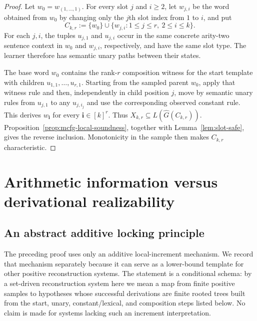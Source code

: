 \documentclass[11pt]{article}
\begin{document}
\begin{proof}
Let $w_0=w_{(1,\ldots,1)}$.  For every slot $j$ and $i\ge2$, let $w_{j,i}$
be the word obtained from $w_0$ by changing only the $j$th slot index from
$1$ to $i$, and put
\[
 C_{k,r}:=\{w_0\}\cup\{w_{j,i}:1\le j\le r,\ 2\le i\le k\}.
\]
For each $j,i$, the tuples $u_{j,1}$ and $u_{j,i}$ occur in the same concrete
arity-two sentence context in $w_0$ and $w_{j,i}$, respectively, and have the
same slot type.  The learner therefore has semantic unary paths between their
states.

The base word $w_0$ contains the rank-$r$ composition witness for the
start template with children $u_{1,1},\ldots,u_{r,1}$.  Starting from the
sampled parent $w_0$, apply that witness rule and then, independently in child
position $j$, move by semantic unary rules from $u_{j,1}$ to any
$u_{j,i_j}$ and use the corresponding observed constant rule.  This derives
$w_{\mathbf i}$ for every $\mathbf i\in[k]^r$.  Thus
$X_{k,r}\subseteq L(\widehat G(C_{k,r}))$.  Proposition~\ref{prop:mcfg-local-soundness}, together with
Lemma~\ref{lem:slot-safe}, gives the reverse inclusion.  Monotonicity in the
sample then makes $C_{k,r}$ characteristic.
\end{proof}


\section{Arithmetic information versus derivational realizability}
\label{sec:arith-realizability}

\subsection{An abstract additive locking principle}
\label{subsec:additive-locking}

The preceding proof uses only an additive local-increment mechanism.  We record
that mechanism separately because it can serve as a lower-bound template for
other positive reconstruction systems.  The statement is a conditional schema:
by a set-driven reconstruction system here we mean a map from finite positive
samples to hypotheses whose successful derivations are finite rooted trees built
from the start, unary, constant/lexical, and composition steps listed below.
No claim is made for systems lacking such an increment interpretation.
\end{document}
